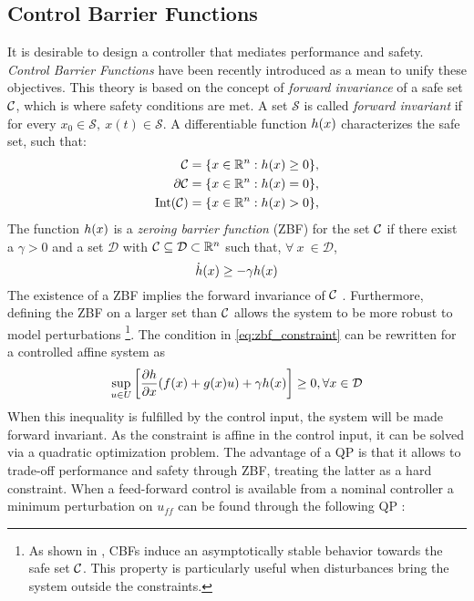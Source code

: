 \subsection{Control Barrier Functions}
It is desirable to design a controller that mediates performance and safety. \emph{Control Barrier Functions} have been recently introduced as a mean to unify these objectives. This theory is based on the concept of \emph{forward invariance} of a safe set $\mathcal{C} $, which is where safety conditions are met. A set $\mathcal{S}$ is called \emph{forward invariant} if for every $x_0 \in \mathcal{S},\ x(t) \in \mathcal{S}$. A differentiable function $h(x)$  characterizes the safe set, such that:
\begin{align*}
    \mathcal{C} &= \{ x \in \mathbb{R}^{n} : h(x) \geq 0 \}, \\
    \partial \mathcal{C} &= \{ x \in \mathbb{R}^{n} : h(x) = 0 \}, \\
    \text{Int}(\mathcal{C}) &= \{ x \in \mathbb{R}^{n} : h(x) > 0 \},
\end{align*}
The function $h(x)$ is a \emph{zeroing barrier function} (ZBF) for the set $ \mathcal{C} $ if there exist a $\gamma > 0$ and a set $\mathcal{D}$ with $\mathcal{C} \subseteq \mathcal{D} \subset \mathbb{R}^{n}$ such that, $\forall \  x \  \in \mathcal{D}$, 
\begin{equation} \label{eq:zbf_constraint}
    \dot{h}(x) \geq -\gamma h(x)
\end{equation}
The existence of a ZBF implies the forward invariance of $\mathcal{C}$ \cite{ames2016control}. Furthermore, defining the ZBF on a larger set than $\mathcal{C}$ allows the system to be more robust to model perturbations \footnote{As shown in \cite{ames2016control}, CBFs induce an asymptotically stable behavior towards the safe set $\mathcal{C}$. This property is particularly useful when disturbances bring the system outside the constraints.}. The condition in \eqn \ref{eq:zbf_constraint} can be rewritten for a controlled affine system as
\begin{equation}
    \sup_{u \in U} \left[ \frac{\partial h }{\partial x} (f(x) + g(x)u) + \gamma h(x) \right] \geq 0, \forall x \in \mathcal{D}
\end{equation}
When this inequality is fulfilled by the control input, the system will be made forward invariant. 
As the constraint is affine in the control input, it can be solved via a quadratic optimization problem. The advantage of a QP is that it allows to trade-off performance and safety through ZBF, treating the latter as a hard constraint. When a feed-forward control is available from a nominal controller a minimum perturbation on $u_{ff}$ can be found through the following QP \cite{ames2019control}:
